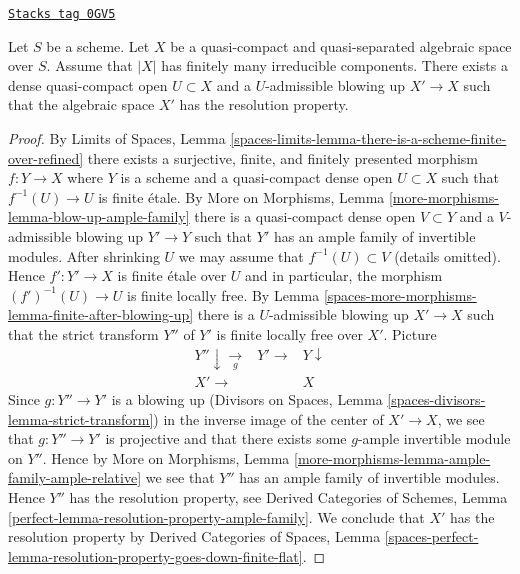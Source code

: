 \begin{lemma}
\label{spaces-more-morphisms-lemma-blow-up-resolution-property}
\href{https://stacks.math.columbia.edu/tag/0GV5}{\texttt{Stacks tag 0GV5}}

Let $S$ be a scheme. Let $X$ be a quasi-compact and quasi-separated
algebraic space over $S$. Assume that $|X|$ has finitely many irreducible
components. There exists a dense quasi-compact open $U \subset X$
and a $U$-admissible blowing up $X' \to X$ such that the algebraic space
$X'$ has the resolution property.
\end{lemma}

\begin{proof}
By Limits of Spaces, Lemma
\ref{spaces-limits-lemma-there-is-a-scheme-finite-over-refined}
there exists a surjective, finite, and finitely presented morphism
$f : Y \to X$ where $Y$ is a scheme and a quasi-compact dense open
$U \subset X$ such that $f^{-1}(U) \to U$ is finite \'etale.
By More on Morphisms, Lemma \ref{more-morphisms-lemma-blow-up-ample-family}
there is a quasi-compact dense open $V \subset Y$ and a $V$-admissible
blowing up $Y' \to Y$ such that $Y'$ has an ample family of invertible
modules. After shrinking $U$ we may assume that $f^{-1}(U) \subset V$
(details omitted). Hence $f' : Y' \to X$ is finite \'etale over $U$
and in particular, the morphism $(f')^{-1}(U) \to U$ is finite locally free.
By Lemma \ref{spaces-more-morphisms-lemma-finite-after-blowing-up} there is a $U$-admissible
blowing up $X' \to X$ such that the strict transform $Y''$ of $Y'$
is finite locally free over $X'$. Picture
$$
\begin{array}{ccc}Y'' \downarrow\underset{g}{\longrightarrow} & Y' \longrightarrow & Y \downarrow \\ X' \longrightarrow &  & X\end{array}
$$
Since $g : Y'' \to Y'$ is a blowing up
(Divisors on Spaces, Lemma \ref{spaces-divisors-lemma-strict-transform})
in the inverse image of the center of $X' \to X$, we see that
$g : Y'' \to Y'$ is projective and that there exists some
$g$-ample invertible module on $Y''$. Hence by
More on Morphisms, Lemma \ref{more-morphisms-lemma-ample-family-ample-relative}
we see that $Y''$ has an ample family of invertible modules.
Hence $Y''$ has the resolution property, see
Derived Categories of Schemes, Lemma
\ref{perfect-lemma-resolution-property-ample-family}.
We conclude that $X'$ has the resolution property
by
Derived Categories of Spaces, Lemma
\ref{spaces-perfect-lemma-resolution-property-goes-down-finite-flat}.
\end{proof}

